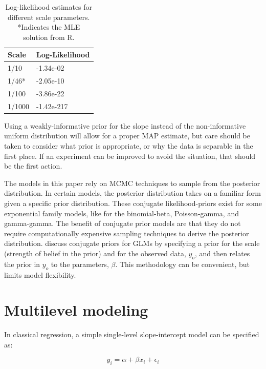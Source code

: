 \documentclass[11pt, oneside, openany]{scrbook}
\begin{document}
\begin{table}[!h]
\centering
\caption{\label{tab:ch030-Quality-Surreal-Street}Log-likelihood estimates for different scale parameters. *Indicates the MLE solution from R.}
\centering
\begin{tabular}[t]{ll}
\toprule
Scale & Log-Likelihood\\
\midrule
1/10 & -1.34e-02\\
1/46* & -2.05e-10\\
1/100 & -3.86e-22\\
1/1000 & -1.42e-217\\
\bottomrule
\end{tabular}
\end{table}

Using a weakly-informative prior for the slope instead of the non-informative uniform distribution will allow for a proper MAP estimate, but care should be taken to consider what prior is appropriate, or why the data is separable in the first place. If an experiment can be improved to avoid the situation, that should be the first action.

The models in this paper rely on MCMC techniques to sample from the posterior distribution. In certain models, the posterior distribution takes on a familiar form given a specific prior distribution. These conjugate likelihood-priors exist for some exponential family models, like for the binomial-beta, Poisson-gamma, and gamma-gamma. The benefit of conjugate prior models are that they do not require computationally expensive sampling techniques to derive the posterior distribution. \citet{chen2003conjugate} discuss conjugate priors for GLMs by specifying a prior for the scale (strength of belief in the prior) and for the observed data, \(y_o\), and then relates the prior in \(y_o\) to the parameters, \(\beta\). This methodology can be convenient, but limits model flexibility.

\hypertarget{multilevel-modeling}{%
\section{Multilevel modeling}\label{multilevel-modeling}}

In classical regression, a simple single-level slope-intercept model can be specified as:

\begin{equation}
y_i = \alpha + \beta x_i + \epsilon_i
\label{eq:single-level-fixed}
\end{equation}
\end{document}
